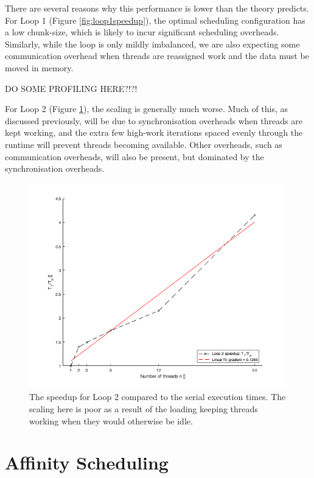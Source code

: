 \documentclass{article} %
\begin{document}
There are several reasons why this performance is lower than the theory predicts. 
For Loop 1 (Figure \ref{fig:loop1speedup}), the optimal scheduling configuration has a low chunk-size, which is likely to incur significant scheduling overheads.
Similarly, while the loop is only mildly imbalanced, we are also expecting some communication overhead when threads are reassigned work and the data must be moved in memory.

DO SOME PROFILING HERE?!?!

For Loop 2 (Figure \ref{fig:loop2speedup}), the scaling is generally much worse.
Much of this, as discussed previously, will be due to synchronisation overheads when threads are kept working, and the extra few high-work iterations spaced evenly through the runtime will prevent threads becoming available.
Other overheads, such as communication overheads, will also be present, but dominated by the synchronisation overheads.

\begin{figure}
    \centering
    \includegraphics[height=.35\textheight]{part1_plots/loop2_speedup.png}
    \caption{The speedup for Loop 2 compared to the serial execution times. The scaling here is poor as a result of the loading keeping threads working when they would otherwise be idle.}
    \label{fig:loop2speedup}
\end{figure}

\section*{Affinity Scheduling}
\end{document}
